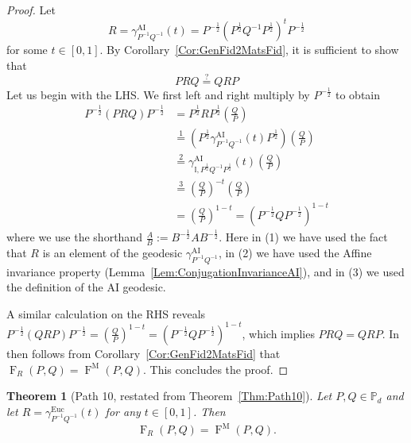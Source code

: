 \documentclass[12pt]{article}
\newtheorem{theorem}{Theorem}[section] %
\theoremstyle{definition}
\begin{document}
\begin{proof}
Let
\begin{equation} R = \gamma_{P ^{-1} Q ^{-1}}^{\mathrm{AI}}(t) = P ^{-\frac 12} \left( P ^{\frac 12} Q ^{-1} P ^{\frac 12} \right)^t P ^{-\frac 12} \end{equation}
for some $t \in [0,1]$.
By Corollary~\ref{Cor:GenFid2MatsFid}, it is sufficient to show that 
\begin{equation}
    P R Q \stackrel{?}{=} Q R P     
\end{equation}
Let us begin with the LHS. We first left and right multiply by $P ^{-\frac 12}$ to obtain
\begin{equation}
    \begin{aligned}
    P ^{-\frac 12} (P R Q) P ^{-\frac 12} &= P ^{\frac 12} R P ^{\frac 12} \left(\frac Q P \right) \\ &\stackrel{1}{=} (P ^{\frac 12} \gamma_{P ^{-1} Q ^{-1}}^{\mathrm{AI}}(t) P ^{\frac 12}) \left(\frac Q P \right) \\
    &\stackrel{2}{=} \gamma_{ \mathbb I, P ^{\frac 12} Q ^{-1} P ^{\frac 12}}^{\mathrm{AI}}(t) \left(\frac Q P \right) \\  &\stackrel{3}{=} \left(\frac Q P \right)^{-t} \left(\frac Q P \right) \\
    &= \left(\frac Q P \right) ^{1-t} = \left(P ^{-\frac 12} Q P ^{-\frac 12}\right)^{1-t}
    \end{aligned}    
\end{equation}
where we use the shorthand $\frac{A}{B} := B ^{-\frac 12} A B ^{-\frac 12}$. Here in (1) we have used the fact that $R$ is an element of the geodesic $\gamma^\mathrm{AI}_{P ^{-1} Q ^{-1}}$, in (2) we have used the Affine invariance property (Lemma~\ref{Lem:ConjugationInvarianceAI}), and in (3) we used the definition of the AI geodesic.

A similar calculation on the RHS reveals $ P ^{-\frac 12} (Q R P ) P ^{-\frac 12}  = \left( \frac Q P\right)^{1-t} = (P ^{-\frac 12} Q P ^{-\frac 12} )^{1-t}$, which implies $PRQ = QRP$. In then follows from Corollary~\ref{Cor:GenFid2MatsFid} that $ \operatorname{F}_R(P,Q) = \operatorname{F}^\mathrm M(P,Q) $. This concludes the proof.

\end{proof}


\begin{theorembox}
    \begin{theorem}[Path 10, restated from Theorem~\ref{Thm:Path10}]\label{App:ThmPath10}
        Let $P, Q \in \mathbb P_d$ and let $R = \gamma_{P ^{-1} Q ^{-1} }^\mathrm{Euc}(t)$ for any $t \in [0,1]$. Then 
        \begin{equation}
             \operatorname{F}_R(P,Q) = \operatorname{F}^\mathrm M(P,Q). 
        \end{equation}
    \end{theorem}
\end{theorembox}
\end{document}

